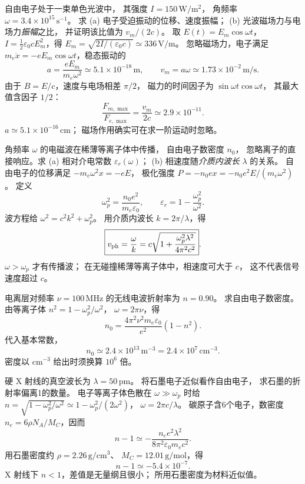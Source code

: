 
自由电子处于一束单色光波中，
其强度 $I=150\,\mathrm{W/m^2}$，
角频率 $\omega=3.4\times10^{15}\,\mathrm{s^{-1}}$。
求 (a) 电子受迫振动的位移、速度振幅；
(b) 光波磁场力与电场力\emph{振幅}之比，
并证明该比值为 $v_m/(2c)$。
\exsolution
取 $E(t)=E_m\cos\omega t$，
$I=\tfrac12\varepsilon_0cE_m^2$，得
$E_m=\sqrt{2I/(\varepsilon_0c)}\simeq336\,\mathrm{V/m}$。
忽略磁场力，电子满足
$m_e\ddot x=-eE_m\cos\omega t$，稳态振动的
\[
 \boxed{a=\frac{eE_m}{m_e\omega^2}
 \simeq5.1\times10^{-18}\,\mathrm m},\qquad
 \boxed{v_m=a\omega
 \simeq1.73\times10^{-2}\,\mathrm{m/s}}.
\]
由于 $B=E/c$，速度与电场相差 $\pi/2$，
磁力的时间因子为 $\sin\omega t\cos\omega t$，
其最大值含因子 $1/2$：
\[
 \boxed{\frac{F_{m,\max}}{F_{e,\max}}
 =\frac{v_m}{2c}\simeq2.9\times10^{-11}}.
\]
\excheck $a\simeq5.1\times10^{-16}\,\mathrm{cm}$；
磁场作用确实可在求一阶运动时忽略。

角频率 $\omega$ 的电磁波在稀薄等离子体中传播，
自由电子数密度 $n_0$，
忽略离子的直接响应。求
(a) 相对介电常数 $\varepsilon_r(\omega)$；
(b) 相速度随\emph{介质内波长} $\lambda$ 的关系。
\exsolution
自由电子的位移满足
$-m_e\omega^2x=-eE$，
极化强度 $P=-n_0ex=-n_0e^2E/(m_e\omega^2)$。
定义
\[
 \omega_p^2=\frac{n_0e^2}{m_e\varepsilon_0},
 \qquad
 \boxed{\varepsilon_r=1-\frac{\omega_p^2}{\omega^2}}.
\]
波方程给 $\omega^2=c^2k^2+\omega_p^2$。
用介质内波长 $k=2\pi/\lambda$，得
\[
 \boxed{v_{\rm ph}=\frac\omega k
 =c\sqrt{1+\frac{\omega_p^2\lambda^2}
 {4\pi^2c^2}}}.
\]
\excheck $\omega>\omega_p$ 才有传播波；
在无碰撞稀薄等离子体中，相速度可大于 $c$，
这不代表信号速度超过 $c$。

电离层对频率 $\nu=100\,\mathrm{MHz}$
的无线电波折射率为 $n=0.90$。
求自由电子数密度。
\exsolution
由等离子体
$n^2=1-\omega_p^2/\omega^2$，
$\omega=2\pi\nu$，得
\[
 \boxed{n_0=
 \frac{4\pi^2\nu^2m_e\varepsilon_0}{e^2}(1-n^2)}.
\]
代入基本常数，
\[
 \boxed{n_0\simeq2.4\times10^{13}\,\mathrm{m^{-3}}
 =2.4\times10^7\,\mathrm{cm^{-3}}}.
\]
\excheck 密度以 $\mathrm{cm^{-3}}$ 给出时须换算 $10^6$ 倍。

硬 X 射线的真空波长为 $\lambda=50\,\mathrm{pm}$。
将石墨电子近似看作自由电子，
求石墨的折射率偏离1的数量。
\exsolution
电子等离子体色散在 $\omega\gg\omega_p$ 时给
$n=\sqrt{1-\omega_p^2/\omega^2}
\simeq1-\omega_p^2/(2\omega^2)$，
$\omega=2\pi c/\lambda$。
碳原子含6个电子，数密度
$n_e=6\rho N_A/M_C$，因而
\[
 \boxed{n-1\simeq-
 \frac{n_e e^2\lambda^2}{8\pi^2\varepsilon_0m_ec^2}}.
\]
用石墨密度约
$\rho=2.26\,\mathrm{g/cm^3}$、
$M_C=12.01\,\mathrm{g/mol}$，得
\[
 \boxed{n-1\simeq-5.4\times10^{-7}}.
\]
\excheck X 射线下 $n<1$，差值是无量纲且很小；
所用石墨密度为材料近似值。

